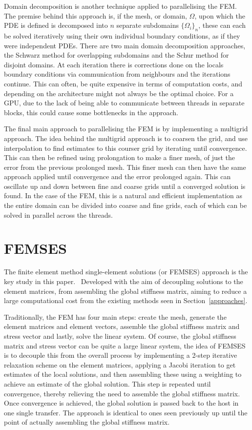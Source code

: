 Domain decomposition is another technique applied to parallelising the FEM. The premise behind this approach is, if the mesh, or domain, $\Omega$, upon which the PDE is defined is decomposed into $n$ separate subdomains $\{\Omega_i\}_n$, these can each be solved iteratively using their own individual boundary conditions, as if they were independent PDEs. There are two main domain decomposition approaches, the Schwarz method for overlapping subdomains and the Schur method for disjoint domains. At each iteration there is corrections done on the locals boundary conditions via communication from neighbours and the iterations continue. This can often, be quite expensive in terms of computation costs, and depending on the architecture might not always be the optimal choice. For a GPU, due to the lack of being able to communicate between threads in separate blocks, this could cause some bottlenecks in the approach.

The final main approach to parallelising the FEM is by implementing a multigrid approach. The idea behind the multigrid approach is to coarsen the grid, and use interpolation to find estimates to this courser grid by iterating until convergence. This can then be refined using prolongation to make a finer mesh, of just the error from the previous prolonged mesh. This finer mesh can then have the same approach applied until convergence and the error prolonged again. This can oscillate up and down between fine and coarse grids until a converged solution is found. In the case of the FEM, this is a natural and efficient implementation as the entire domain can be divided into coarse and fine grids, each of which can be solved in parallel across the threads.
\section{FEMSES}

The finite element method single-element solutions (or FEMSES) approach is the key study in this paper.~\cite{femses} Developed with the aim of decoupling solutions to the element matrices, from assembling the global stiffness matrix, aiming to reduce a large computational cost from the existing methods seen in Section~\ref{approaches}.

Traditionally, the FEM has four main steps: create the mesh, generate the element matrices and element vectors, assemble the global stiffness matrix and stress vector and lastly, solve the linear system. Of course, the global stiffness matrix and stress vector can be quite a large linear system, the idea of FEMSES is to decouple this from the overall process by implementing a 2-step iterative relaxation scheme on the element matrices, applying a Jacobi iteration to get estimates of the local solutions, and then assembling these using a weighting to achieve an estimate of the global solution. This step is repeated until convergence, thereby relieving the need to assemble the global stiffness matrix. Once convergence is achieved, the global solution is passed back to the host in one single transfer. The approach is identical to ones seen previously up until the point of actually assembling the global stiffness matrix.

